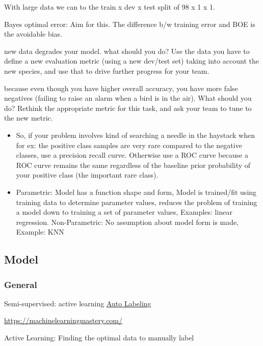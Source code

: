 \documentclass[]{book}
\begin{document}
With large data we can to the train x dev x test split of 98 x 1 x 1.

Bayes optimal error: Aim for this. The difference b/w training error and
BOE is the avoidable bias.

new data degrades your model. what should you do? Use the data you have
to define a new evaluation metric (using a new dev/test set) taking into
account the new species, and use that to drive further progress for your
team.

because even though you have higher overall accuracy, you have more
false negatives (failing to raise an alarm when a bird is in the air).
What should you do? Rethink the appropriate metric for this task, and
ask your team to tune to the new metric.

\begin{itemize}
\item
  So, if your problem involves kind of searching a needle in the
  haystack when for ex: the positive class samples are very rare
  compared to the negative classes, use a precision recall curve.
  Otherwise use a ROC curve because a ROC curve remains the same
  regardless of the baseline prior probability of your positive class
  (the important rare class).
\item
  Parametric: Model has a function shape and form, Model is trained/fit
  using training data to determine parameter values, reduces the problem
  of training a model down to training a set of parameter values,
  Examples: linear regression. Non-Parametric: No assumption about model
  form is made, Example: KNN
\end{itemize}

\subsection{Model}\label{model-2}

\subsubsection{General}\label{general-6}

Semi-supervised: active learning \textbar{}
\href{https://blog.fastforwardlabs.com/2018/09/28/snorkel-rapid-training-data-creation-with-weak-supervision.html}{Auto
Labeling}

\url{https://machinelearningmastery.com/}

Active Learning: Finding the optimal data to manually label
\end{document}
